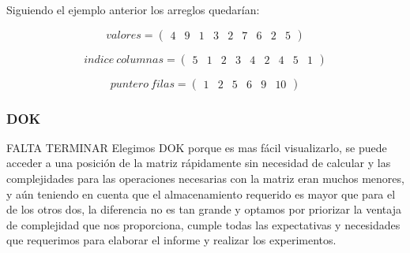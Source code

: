 Siguiendo el ejemplo anterior los arreglos quedarían:

\[ valores= \left( \begin{array}{ccccccccc}
4 & 9 & 1 & 3 & 2 & 7 & 6 & 2 & 5\end{array} 
\right)\] 

\[ indice\ columnas = \left( \begin{array}{ccccccccc}
5 & 1 & 2 & 3 & 4 & 2 & 4 & 5 & 1\end{array} 
\right)\] 

\[ puntero\ filas = \left( \begin{array}{cccccc}
1 & 2 & 5 & 6 & 9 & 10\end{array} 
\right)\] 

\subsubsection{DOK}

FALTA TERMINAR
Elegimos DOK porque es mas fácil visualizarlo, se puede acceder a una posición de la matriz rápidamente sin necesidad de calcular y las complejidades para las operaciones necesarias con la matriz eran muchos menores, y aún teniendo en cuenta que el almacenamiento requerido es mayor que para el de los otros dos, la diferencia no es tan grande y optamos por priorizar la ventaja de complejidad que nos proporciona, cumple todas las expectativas y necesidades que requerimos para elaborar el informe y realizar los experimentos.




